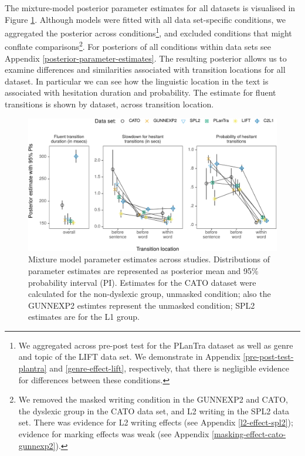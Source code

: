 \documentclass[
  man,floatsintext]{apa7}
\begin{document}
The mixture-model posterior parameter estimates for all datasets is visualised in Figure \ref{fig:crossstudypost2}. Although models were fitted with all data set-specific conditions, we aggregated the posterior across conditions\footnote{We aggregated across pre-post test for the PLanTra dataset as well as genre and topic of the LIFT data set. We demonstrate in Appendix \ref{pre-post-test-plantra} and \ref{genre-effect-lift}, respectively, that there is negligible evidence for differences between these conditions.}, and excluded conditions that might conflate comparisons\footnote{We removed the masked writing condition in the GUNNEXP2 and CATO, the dyslexic group in the CATO data set, and L2 writing in the SPL2 data set. There was evidence for L2 writing effects (see Appendix \ref{l2-effect-spl2}); evidence for marking effects was weak (see Appendix \ref{masking-effect-cato-gunnexp2}).}. For posteriors of all conditions within data sets see Appendix \ref{posterior-parameter-estimates}. The resulting posterior allows us to examine differences and similarities associated with transition locations for all dataset. In particular we can see how the linguistic location in the text is associated with hesitation duration and probability. The estimate for fluent transitions is shown by dataset, across transition location.

\begin{figure}

{\centering \includegraphics{manuscript_files/figure-latex/crossstudypost2-1} 

}

\caption{Mixture model parameter estimates across studies. Distributions of parameter estimates are represented as posterior mean and 95\% probability interval (PI). Estimates for the CATO dataset were calculated for the non-dyslexic group, unmasked condition; also the GUNNEXP2 estimtes represent the unmasked condition; SPL2 estimates are for the L1 group.}\label{fig:crossstudypost2}
\end{figure}
\end{document}
